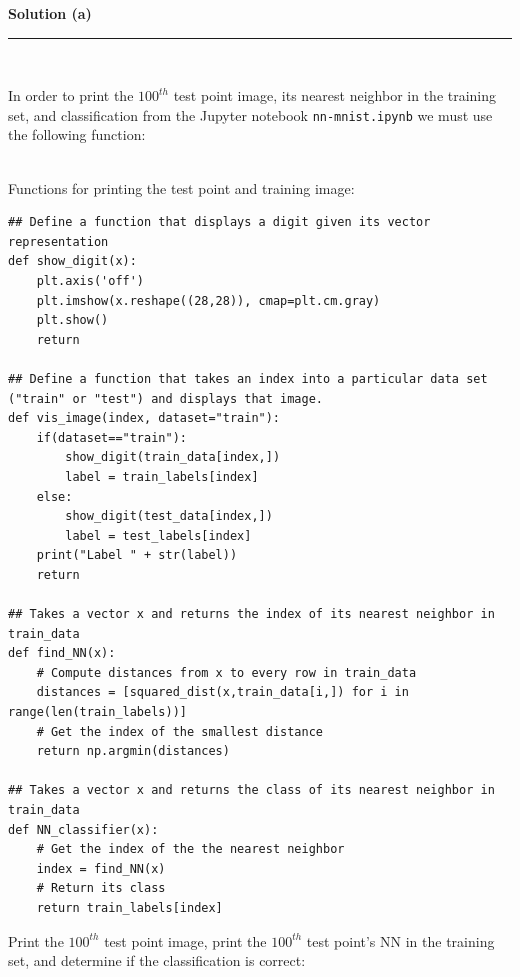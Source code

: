 \documentclass{article}
\begin{document}
\textbf{Solution (a)}

\noindent\rule{\textwidth}{0.4pt}\\

\parbox{\textwidth}{In order to print the $100^{th}$ test point image, its nearest neighbor in the training set, and classification from the Jupyter notebook \texttt{nn-mnist.ipynb} we must use the following function:}\\

Functions for printing the test point and training image:\\
\begin{center}

\begin{lstlisting}
## Define a function that displays a digit given its vector representation
def show_digit(x):
    plt.axis('off')
    plt.imshow(x.reshape((28,28)), cmap=plt.cm.gray)
    plt.show()
    return

## Define a function that takes an index into a particular data set ("train" or "test") and displays that image.
def vis_image(index, dataset="train"):
    if(dataset=="train"): 
        show_digit(train_data[index,])
        label = train_labels[index]
    else:
        show_digit(test_data[index,])
        label = test_labels[index]
    print("Label " + str(label))
    return

## Takes a vector x and returns the index of its nearest neighbor in train_data
def find_NN(x):
    # Compute distances from x to every row in train_data
    distances = [squared_dist(x,train_data[i,]) for i in range(len(train_labels))]
    # Get the index of the smallest distance
    return np.argmin(distances)

## Takes a vector x and returns the class of its nearest neighbor in train_data
def NN_classifier(x):
    # Get the index of the the nearest neighbor
    index = find_NN(x)
    # Return its class
    return train_labels[index]

\end{lstlisting}
    
\end{center}
\newpage
\parbox{\textwidth}{Print the $100^{th}$ test point image, print the $100^{th}$ test point's NN in the training set, and determine if the classification is correct:}\\
\end{document}
